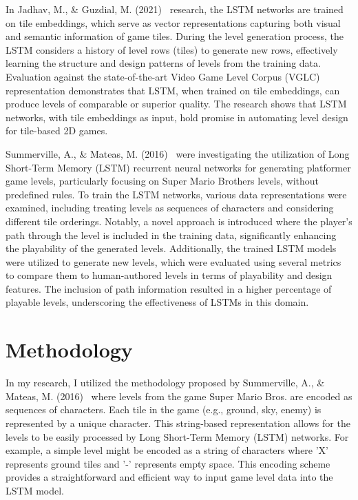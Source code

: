 \documentclass[runningheads]{llncs}
\begin{document}
In Jadhav, M., \& Guzdial, M. (2021)~\cite{ref_article29} research, the LSTM networks are trained on tile embeddings, which serve as vector representations capturing both visual and semantic information of game tiles. During the level generation process, the LSTM considers a history of level rows (tiles) to generate new rows, effectively learning the structure and design patterns of levels from the training data. Evaluation against the state-of-the-art Video Game Level Corpus (VGLC) representation demonstrates that LSTM, when trained on tile embeddings, can produce levels of comparable or superior quality. The research shows that LSTM networks, with tile embeddings as input, hold promise in automating level design for tile-based 2D games.

Summerville, A., \& Mateas, M. (2016)~\cite{ref_article14} were investigating the utilization of Long Short-Term Memory (LSTM) recurrent neural networks for generating platformer game levels, particularly focusing on Super Mario Brothers levels, without predefined rules. To train the LSTM networks, various data representations were examined, including treating levels as sequences of characters and considering different tile orderings. Notably, a novel approach is introduced where the player's path through the level is included in the training data, significantly enhancing the playability of the generated levels. Additionally, the trained LSTM models were utilized to generate new levels, which were evaluated using several metrics to compare them to human-authored levels in terms of playability and design features. The inclusion of path information resulted in a higher percentage of playable levels, underscoring the effectiveness of LSTMs in this domain.



\section{Methodology}
In my research, I utilized the methodology proposed by Summerville, A., \& Mateas, M. (2016)~\cite{ref_article14} where levels from the game Super Mario Bros. are encoded as sequences of characters. Each tile in the game (e.g., ground, sky, enemy) is represented by a unique character. This string-based representation allows for the levels to be easily processed by Long Short-Term Memory (LSTM) networks. For example, a simple level might be encoded as a string of characters where 'X' represents ground tiles and '-' represents empty space. This encoding scheme provides a straightforward and efficient way to input game level data into the LSTM model.
\end{document}
